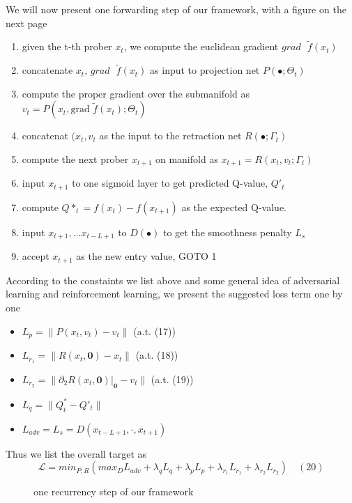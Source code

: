 \documentclass[letterpaper]{article}
\begin{document}
We will now present one forwarding step of our framework, with a figure on the next page

\begin{enumerate}
  \item given the t-th prober $x_t$, we compute the euclidean gradient $grad \text{ }\tilde{f}(x_t)$
  \item concatenate $x_t$, $grad \text{ }\tilde{f}(x_t)$ as input to projection net $P(\bullet;\Theta_t)$
  \item compute the proper gradient over the submanifold as $\mathit{v}_t=P(x_t, \text{grad }\tilde{f}(x_t);\Theta_t)$
  \item concatenat $(x_t, \mathit{v}_t$ as the input to the retraction net $R(\bullet;\Gamma_t)$
  \item compute the next prober $x_{t+1}$ on manifold as $x_{t+1}=R(x_t, \mathit{v}_t;\Gamma_t)$
  \item input $x_{t+1}$ to one sigmoid layer to get predicted Q-value, $Q'_t$
  \item compute $Q*_t=f(x_t)-f(x_{t+1})$ as the expected Q-value.
  \item input $x_{t+1}, ... x_{t-L+1}$ to $D(\bullet)$ to get the smoothness penalty $L_{s}$
  \item accept $x_{t+1}$ as the new entry value, GOTO 1
\end{enumerate}


According to the constaints we list above and some general idea of adversarial learning and reinforcement learning, we present the suggested loss term one by one
\begin{itemize}
  \item $L_p=\|P(x_t, \mathit{v}_t)-\mathit{v}_t\|$ (a.t. (17))
  \item $L_{r_1}=\|R(x_t, \mathbf{0})-x_t\|$ (a.t. (18))
  \item $L_{r_2}=\|\partial_{2}R(x_t, \mathbf{0})|_{\mathbf{0}}-\mathit{v}_t\|$ (a.t. (19))
  \item $L_{q}=\|Q^{*}_t-Q'_t\|$
  \item $L_{adv}=L_{s}=D(x_{t-L+1}, \cdot, x_{t+1})$
\end{itemize}

Thus we list the overall target as
$$
  \mathcal{L} = min_{P,R}(max_{D}{L_{adv}}+\lambda_q{L_q}+\lambda_p{L_p}+\lambda_{r_1}{L_{r_1}}+\lambda_{r_2}{L_{r_2}}) \quad (20)
$$



\begin{figure}[!htb]
      \caption{\label{fig:my-label} one recurrency step of our framework}
\end{figure}
\end{document}
